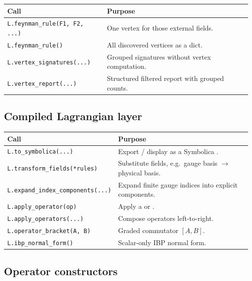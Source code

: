 \begin{center}
\begin{tabular}{@{}P{5.4cm}p{7cm}@{}}
\toprule
\normalfont\textbf{Call} & \textbf{Purpose} \\
\midrule
\texttt{L.feynman\_rule(F1, F2, ...)} & One vertex for those external fields. \\
\texttt{L.feynman\_rule()} & All discovered vertices as a dict. \\
\texttt{L.vertex\_signatures(...)} & Grouped signatures without vertex computation. \\
\texttt{L.vertex\_report(...)} & Structured filtered report with grouped counts. \\
\bottomrule
\end{tabular}
\end{center}

\subsection*{Compiled Lagrangian layer}

\begin{center}
\begin{tabular}{@{}P{5.4cm}p{7cm}@{}}
\toprule
\normalfont\textbf{Call} & \textbf{Purpose} \\
\midrule
\texttt{L.to\_symbolica(...)} & Export / display as a Symbolica . \\
\texttt{L.transform\_fields(*rules)} & Substitute fields, e.g.\ gauge basis $\to$ physical basis. \\
\texttt{L.expand\_index\_components(...)} & Expand finite gauge indices into explicit components. \\
\texttt{L.apply\_operator(op)} & Apply a  or . \\
\texttt{L.apply\_operators(...)} & Compose operators left-to-right. \\
\texttt{L.operator\_bracket(A, B)} & Graded commutator $[A,B]$. \\
\texttt{L.ibp\_normal\_form()} & Scalar-only IBP normal form. \\
\bottomrule
\end{tabular}
\end{center}

\subsection*{Operator constructors}

